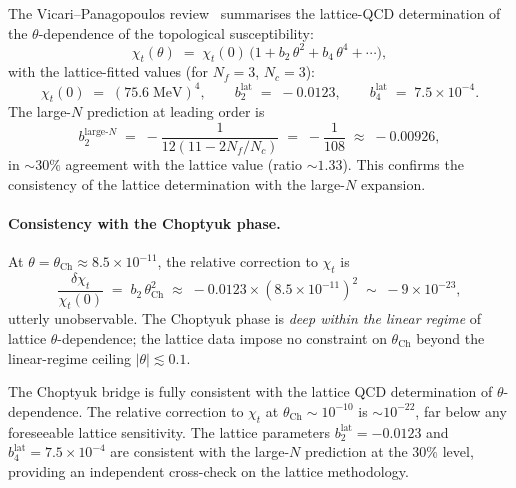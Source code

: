 The Vicari--Panagopoulos review~\cite{vicaripanagopoulos2009}
summarises the lattice-QCD determination of the $\theta$-dependence of
the topological susceptibility:
\begin{equation}\label{eq:chi-t-theta}
  \chi_t(\theta)\;=\;\chi_t(0)\,\bigl(1 + b_2\,\theta^2 + b_4\,\theta^4 + \cdots\bigr),
\end{equation}
with the lattice-fitted values (for $N_f=3$, $N_c=3$):
\begin{equation}
  \chi_t(0)\;=\;(75.6\;\mathrm{MeV})^4,\qquad
  b_2^{\mathrm{lat}}\;=\;-0.0123,\qquad
  b_4^{\mathrm{lat}}\;=\;7.5\times 10^{-4}.
\end{equation}
The large-$N$ prediction at leading order is
\begin{equation}
  b_2^{\mathrm{large}\text{-}N}\;=\;
  -\frac{1}{12(11-2N_f/N_c)}
  \;=\;-\frac{1}{108}\;\approx\;-0.00926,
\end{equation}
in $\sim 30\%$ agreement with the lattice value (ratio $\sim 1.33$).
This confirms the consistency of the lattice determination with the
large-$N$ expansion.

\paragraph{Consistency with the Choptyuk phase.}
At $\theta=\theta_{\mathrm{Ch}}\approx 8.5\times 10^{-11}$, the
relative correction to $\chi_t$ is
\begin{equation}
  \frac{\delta\chi_t}{\chi_t(0)}\;=\;b_2\,\theta_{\mathrm{Ch}}^2
  \;\approx\;-0.0123\times (8.5\times 10^{-11})^2
  \;\sim\;-9\times 10^{-23},
\end{equation}
utterly unobservable.  The Choptyuk phase is \emph{deep within the
linear regime} of lattice $\theta$-dependence; the lattice data impose
no constraint on $\theta_{\mathrm{Ch}}$ beyond the linear-regime
ceiling $|\theta|\lesssim 0.1$.

\begin{keyfind}
The Choptyuk bridge is fully consistent with the lattice QCD
determination of $\theta$-dependence.  The relative correction to
$\chi_t$ at $\theta_{\mathrm{Ch}}\sim 10^{-10}$ is $\sim 10^{-22}$,
far below any foreseeable lattice sensitivity.  The lattice parameters
$b_2^{\mathrm{lat}}=-0.0123$ and $b_4^{\mathrm{lat}}=7.5\times 10^{-4}$
are consistent with the large-$N$ prediction at the $30\%$ level,
providing an independent cross-check on the lattice methodology.
\end{keyfind}


